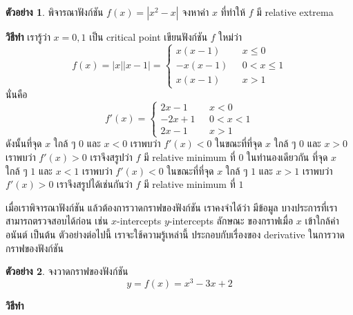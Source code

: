 \documentclass[
]{book}
\theoremstyle{definition}
\theoremstyle{definition}
\newtheorem{example}{ตัวอย่าง}[chapter]
\theoremstyle{definition}
\theoremstyle{definition}
\theoremstyle{remark}
\begin{document}
\begin{example}
พิจารณาฟังก์ชัน \(f(x) = |x^2-x|\) จงหาค่า \(x\) ที่ทำให้ \(f\) มี relative extrema
\end{example}

\textbf{วิธีทำ} เรารู้ว่า \(x=0,1\) เป็น critical point เขียนฟังก์ชัน \(f\) ใหม่ว่า
\[f(x) = |x||x-1| = \begin{cases}
    x(x-1) & \text{ $x \le 0$}  \\
    -x(x-1) & \text{ $0< x \le 1$} \\
    x(x-1) & \text{ $x > 1$}
    \end{cases}\] นั่นคือ \[f'(x) = \begin{cases}
    2x-1 & \text{ $x < 0$} \\
    -2x+1 & \text{ $0 < x < 1$} \\
    2x-1 & \text{ $x> 1$}
    \end{cases}\] ดังนั้นที่จุด \(x\) ใกล้ ๆ \(0\) และ \(x<0\) เราพบว่า \(f'(x) < 0\)
ในขณะที่ที่จุด \(x\) ใกล้ ๆ \(0\) และ \(x>0\) เราพบว่า \(f'(x) > 0\) เราจึงสรูปว่า \(f\) มี
relative minimum ที่ \(0\) ในทำนองเดียวกัน ที่จุด \(x\) ใกล้ ๆ \(1\) และ \(x<1\) เราพบว่า
\(f'(x) < 0\) ในขณะที่ที่จุด \(x\) ใกล้ ๆ \(1\) และ \(x>1\) เราพบว่า \(f'(x) > 0\)
เราจึงสรูปได้เช่นกันว่า \(f\) มี relative minimum ที่ \(1\)

เมื่อเราพิจารณาฟังก์ชัน แล้วต้องการวาดกราฟของฟังก์ชัน เราคงจำได้ว่า มีข้อมูล
บางประการที่เราสามารถตรวจสอบได้ก่อน เช่น \(x\)-intercepts \(y\)-intercepts ลักษณะ
ของกราฟเมื่อ \(x\) เข้าใกล้ค่าอนันต์ เป็นต้น ตัวอย่างต่อไปนี้ เราจะใช้ความรู้เหล่านี้
ประกอบกับเรื่องของ derivative ในการวาดกราฟของฟังก์ชัน

\begin{example}
จงวาดกราฟของฟังก์ชัน \[y = f(x) =  x^3-3x+2\]
\end{example}

\textbf{วิธีทำ}
\end{document}
